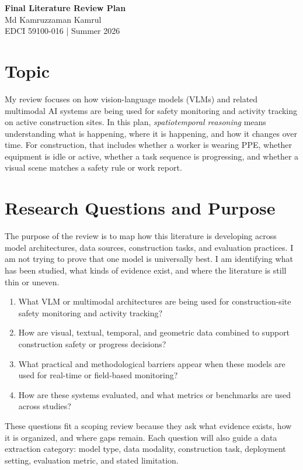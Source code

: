 \documentclass[10pt, letterpaper]{article}
\begin{document}
\begin{center}
  {\Large\bfseries Final Literature Review Plan}\\[0.35em]
  {\normalsize Md Kamruzzaman Kamrul}\\
  {\normalsize EDCI 59100-016 | Summer 2026}
\end{center}

\section{Topic}

My review focuses on how vision-language models (VLMs) and related multimodal AI systems are being used for safety monitoring and activity tracking on active construction sites. In this plan, \textit{spatiotemporal reasoning} means understanding what is happening, where it is happening, and how it changes over time. For construction, that includes whether a worker is wearing PPE, whether equipment is idle or active, whether a task sequence is progressing, and whether a visual scene matches a safety rule or work report.

\section{Research Questions and Purpose}

The purpose of the review is to map how this literature is developing across model architectures, data sources, construction tasks, and evaluation practices. I am not trying to prove that one model is universally best. I am identifying what has been studied, what kinds of evidence exist, and where the literature is still thin or uneven.

\begin{enumerate}[label=\textbf{RQ\arabic*:}]
  \item What VLM or multimodal architectures are being used for construction-site safety monitoring and activity tracking?
  \item How are visual, textual, temporal, and geometric data combined to support construction safety or progress decisions?
  \item What practical and methodological barriers appear when these models are used for real-time or field-based monitoring?
  \item How are these systems evaluated, and what metrics or benchmarks are used across studies?
\end{enumerate}

These questions fit a scoping review because they ask what evidence exists, how it is organized, and where gaps remain. Each question will also guide a data extraction category: model type, data modality, construction task, deployment setting, evaluation metric, and stated limitation.
\end{document}
